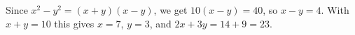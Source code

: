 Since $x^2-y^2=(x+y)(x-y)$, we get $10(x-y)=40$, so $x-y=4$. With $x+y=10$ this gives $x=7$, $y=3$, and $2x+3y=14+9=\boxed{23}$.
